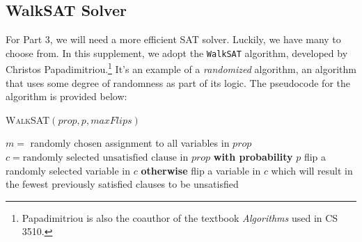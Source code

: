 \documentclass{article}
\begin{document}
\subsection*{WalkSAT Solver}
        For Part 3, we will need a more efficient SAT solver. Luckily, we have many to choose from. In this supplement, we adopt the \lstinline{WalkSAT} algorithm, developed by Christos Papadimitriou.\footnote{Papadimitriou is also the coauthor of the textbook \textit{Algorithms} used in CS 3510.} It's an example of a \textit{randomized} algorithm, an algorithm that uses some degree of randomness as part of its logic. The pseudocode for the algorithm is provided below:
    
    \begin{algorithm}
        \caption{\textsc{WalkSAT}$(prop, p, maxFlips)$}\label{alg:cap}
        \label{alg:walkSAT}
        \begin{algorithmic}
            \State $m =$ randomly chosen assignment to all variables in $prop$
                  \EndIf
                \State $c = \text{randomly selected unsatisfied clause in $prop$}$
                \State \textbf{with probability} $p$  flip a randomly selected variable in $c$
                \State \textbf{otherwise} flip a variable in $c$ which will result in the fewest previously satisfied clauses to be unsatisfied
            \EndFor
            \State {}
        \end{algorithmic}
    \end{algorithm}
\end{document}
